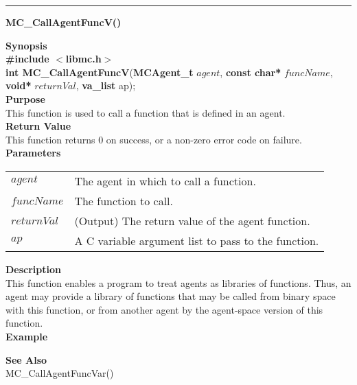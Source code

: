 \noindent
\vspace{5pt}
\rule{6.5in}{0.015in}
\noindent
{}
{\LARGE \bf MC\_CallAgentFuncV()}\\

\noindent
{\bf Synopsis}\\
{\bf \#include $<$libmc.h$>$}\\
{\bf int MC\_CallAgentFuncV}({\bf MCAgent\_t} $agent$, {\bf const char*} $funcName$, {\bf void*} $returnVal$, {\bf va\_list} ap);\\

\noindent
{\bf Purpose}\\
This function is used to call a function that is defined in an agent. \\

\noindent
{\bf Return Value}\\
This function returns 0 on success, or a non-zero error code on failure. \\

\noindent
{\bf Parameters}
\vspace{-0.1in}
\begin{description}
\item
\begin{tabular}{ll}
$agent$ & The agent in which to call a function. \\
$funcName$ & The function to call. \\
$returnVal$ & (Output) The return value of the agent function. \\
$ap$ &  A C variable argument list to pass to the function. 
\end{tabular}
\end{description}

\noindent
{\bf Description}\\
This function enables a program to treat agents as libraries of functions. Thus, an agent
may provide a library of functions that may be called from binary space with this function, 
or from another agent by the agent-space version of this function. \\

\noindent
{\bf Example}\\
\noindent
{\footnotesize}

\noindent
{\bf See Also}\\
MC\_CallAgentFuncVar()


